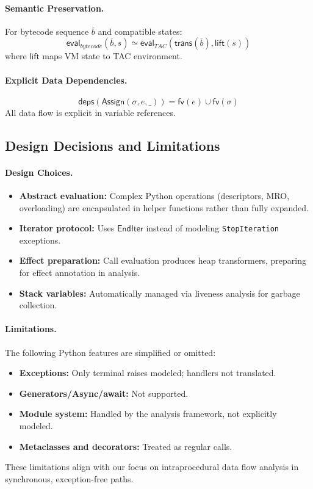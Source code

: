 \paragraph{Semantic Preservation.}
For bytecode sequence $\overline{b}$ and compatible states:
\[
\mathsf{eval}_{bytecode}(\overline{b}, s) \simeq \mathsf{eval}_{TAC}(\mathsf{trans}(\overline{b}), \mathsf{lift}(s))
\]
where $\mathsf{lift}$ maps VM state to TAC environment.

\paragraph{Explicit Data Dependencies.}
\[
\mathsf{deps}(\mathsf{Assign}(\sigma, e, \_)) = \mathsf{fv}(e) \cup \mathsf{fv}(\sigma)
\]
All data flow is explicit in variable references.

\subsection{Design Decisions and Limitations}

\paragraph{Design Choices.}
\begin{itemize}
\item \textbf{Abstract evaluation:} Complex Python operations (descriptors, MRO, overloading) are encapsulated in helper functions rather than fully expanded.
\item \textbf{Iterator protocol:} Uses $\mathsf{EndIter}$ instead of modeling \texttt{StopIteration} exceptions.
\item \textbf{Effect preparation:} Call evaluation produces heap transformers, preparing for effect annotation in analysis.
\item \textbf{Stack variables:} Automatically managed via liveness analysis for garbage collection.
\end{itemize}

\paragraph{Limitations.}
The following Python features are simplified or omitted:
\begin{itemize}
\item \textbf{Exceptions:} Only terminal raises modeled; handlers not translated.
\item \textbf{Generators/Async/await:} Not supported.
\item \textbf{Module system:} Handled by the analysis framework, not explicitly modeled.
\item \textbf{Metaclasses and decorators:} Treated as regular calls.
\end{itemize}

These limitations align with our focus on intraprocedural data flow analysis in synchronous, exception-free paths.
